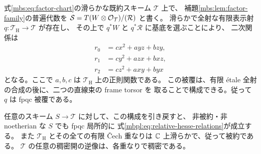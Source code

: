 \begin{lemma}
\label{mbpl:lem:hesse-cover}
式\eqref{mbs:eq:factor-chart}の滑らかな既約スキーム $\mathcal T$ 上で、
補題\ref{mbs:lem:factor-family}の普遍代数を
$\mathcal S=T(W\otimes\mathcal O_{\mathcal T})/(\mathcal R)$ と書く。
滑らかで全射な有限表示射 $q:\mathcal T_{\mathrm H}\to\mathcal T$ が存在し、
その上で $q^*W$ と $q^*\mathcal R$ に基底を選ぶことにより、
二次関係は
\begin{equation}\label{mbpl:eq:relative-hesse-relations}
 \begin{split}
 r_0&=c x^2+a yz+b zy,\\
 r_1&=c y^2+a zx+b xz,\\
 r_2&=c z^2+a xy+b yx
 \end{split}
\end{equation}
となる。ここで $a,b,c$ は $\mathcal T_{\mathrm H}$ 上の正則関数である。
この被覆は、有限 \'etale 全射の合成の後に、二つの直線束の frame torsor を
取ることで構成できる。従って $q$ は fpqc 被覆である。

任意のスキーム $S\to\mathcal T$ に対して、この構成を引き戻すと、
非被約・非 noetherian な $S$ でも fpqc 局所的に
式\eqref{mbpl:eq:relative-hesse-relations}が成立する。
また $\mathcal T_{\mathrm H}$ とその全ての有限 \v Cech 重なりは
$\mathbb C$ 上滑らかで、従って被約である。
$\mathcal T$ の任意の稠密開の逆像は、各重なりで稠密である。
\end{lemma}

